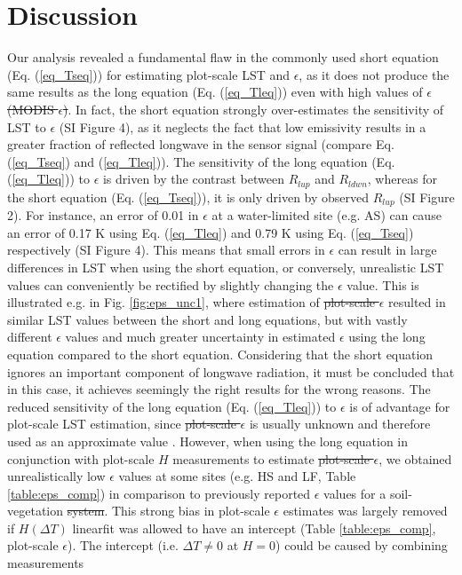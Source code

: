 \documentclass[fleqn,10pt]{wlscirep}
\providecommand{\DIFaddtex}[1]{{\protect\color{blue}\uwave{#1}}} %
\providecommand{\DIFdeltex}[1]{{\protect\color{red}\sout{#1}}}                      %
\providecommand{\DIFaddbegin}{} %
\providecommand{\DIFaddend}{} %
\providecommand{\DIFdelbegin}{} %
\providecommand{\DIFdelend}{} %
\providecommand{\DIFadd}[1]{\texorpdfstring{\DIFaddtex{#1}}{#1}} %
\providecommand{\DIFdel}[1]{\texorpdfstring{\DIFdeltex{#1}}{}} %
\begin{document}
\section{Discussion}
Our analysis revealed a fundamental flaw in the commonly used short equation (Eq. (\ref{eq_Tseq})) for estimating plot-scale LST and \DIFdelbegin \DIFdel{$\epsilon$}\DIFdelend \DIFaddbegin \DIFadd{$\epsilon_{plot}$}\DIFaddend , as it does not produce the same results as the long equation (Eq. (\ref{eq_Tleq})) even with high values of \DIFdelbegin \DIFdel{$\epsilon$ (MODIS $\epsilon$)}\DIFdelend \DIFaddbegin \DIFadd{$\epsilon_{MODIS}$}\DIFaddend . In fact, the short equation strongly over-estimates the sensitivity of LST to $\epsilon$ (SI Figure 4), as it neglects the fact that low emissivity results in a greater fraction of reflected longwave in the sensor signal (compare Eq. (\ref{eq_Tseq}) and (\ref{eq_Tleq})). The sensitivity of the long equation (Eq. (\ref{eq_Tleq})) to $\epsilon$ is driven by the contrast between $R_{lup}$ and $R_{ldwn}$, whereas for the short equation (Eq. (\ref{eq_Tseq})), it is only driven by observed $R_{lup}$ (SI Figure 2). For instance, an error of 0.01 in $\epsilon$ at a water-limited site (e.g. AS) can cause an error of 0.17 K using Eq. (\ref{eq_Tleq}) and 0.79 K using Eq. (\ref{eq_Tseq}) respectively (SI Figure 4). This means that small errors in $\epsilon$ can result in large differences in LST when using the short equation, or conversely, unrealistic LST values can conveniently be rectified by slightly changing the $\epsilon$ value. This is illustrated e.g. in Fig. \ref{fig:eps_unc1}, where estimation of \DIFdelbegin \DIFdel{plot-scale $\epsilon$ }\DIFdelend \DIFaddbegin \DIFadd{$\epsilon_{plot}$ }\DIFaddend resulted in similar LST values between the short and long equations, but with vastly different $\epsilon$ values and much greater uncertainty in estimated $\epsilon$ using the long equation compared to the short equation. Considering that the short equation ignores an important component of longwave radiation, it must be concluded that in this case, it achieves seemingly the right results for the wrong reasons. The reduced sensitivity of the long equation (Eq. (\ref{eq_Tleq})) to $\epsilon$ is of advantage for plot-scale LST estimation, since \DIFdelbegin \DIFdel{plot-scale $\epsilon$ }\DIFdelend \DIFaddbegin \DIFadd{$\epsilon_{plot}$ }\DIFaddend is usually unknown and therefore used as an approximate value \cite{mallick2018bridging}. However, when using the long equation in conjunction with plot-scale $H$ measurements to estimate \DIFdelbegin \DIFdel{plot-scale $\epsilon$}\DIFdelend \DIFaddbegin \DIFadd{$\epsilon_{plot}$}\DIFaddend , we obtained unrealistically low $\epsilon$ values at some sites (e.g. HS and LF, Table \ref{table:eps_comp}) in comparison to previously reported $\epsilon$ values for a soil-vegetation \DIFdelbegin \DIFdel{system}\DIFdelend \DIFaddbegin \DIFadd{syste }\DIFaddend \cite{sugita1996optimal,snyder1998classification}. This strong bias in plot-scale $\epsilon$ estimates was largely removed if  $H(\Delta T)$ linearfit was allowed to have an intercept (Table \ref{table:eps_comp}, plot-scale $\epsilon$). The intercept (i.e. $\Delta T \ne 0$ at $H=0$) could be caused by combining measurements 
\end{document}
